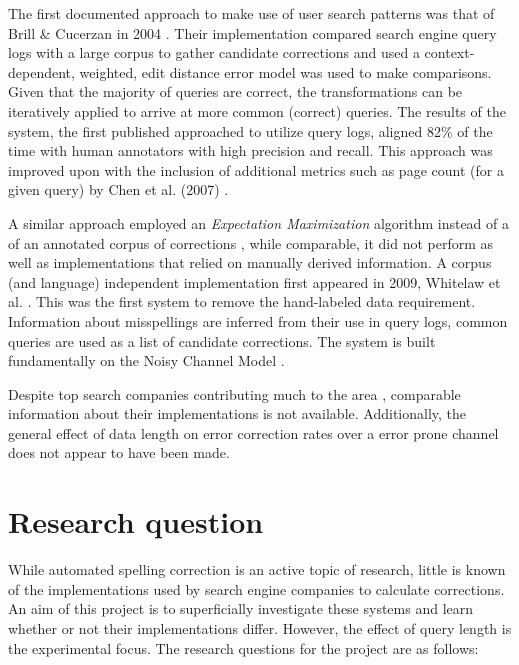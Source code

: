 \documentclass{csfourzero}
\begin{document}
The first documented approach to make use of user search patterns was that of Brill \& Cucerzan in 2004 \cite{webuserpoweredspelling}. Their implementation compared search engine query logs with a large corpus to gather candidate corrections and used a context-dependent, weighted, edit distance error model was used to make comparisons. Given that the majority of queries are correct, the transformations can be iteratively applied to arrive at more common (correct) queries. The results of the system, the first published approached to utilize query logs, aligned 82\% of the time with human annotators with high precision and recall. This approach was improved upon with the inclusion of additional metrics such as page count (for a given query) by Chen et al. (2007) \cite{webuser3}.

A similar approach employed an \textit{Expectation Maximization} algorithm instead of a of an annotated corpus of corrections \cite{webuser2learningerrormodel}, while comparable, it did not perform as well as implementations that relied on manually derived information. A corpus (and language) independent implementation first appeared in 2009, Whitelaw et al. \cite{webuser4google2009}. This was the first system to remove the hand-labeled data requirement. Information about misspellings are inferred from their use in query logs, common queries are used as a list of candidate corrections. The system is built fundamentally on the Noisy Channel Model \cite{claudeshannon1948}.

Despite top search companies contributing much to the area \cite{webuser3, webuserpoweredspelling, microranker, microphone, webuser4google2009}, comparable information about their implementations is not available. Additionally, the general effect of data length on error correction rates over a error prone channel does not appear to have been made.

\section{Research question}
\label{sec:rq}

While automated spelling correction is an active topic of research, little is known of the implementations used by search engine companies to calculate corrections. An aim of this project is to superficially investigate these systems and learn whether or not their implementations differ. However, the effect of query length is the experimental focus. The research questions for the project are as follows:
\end{document}
